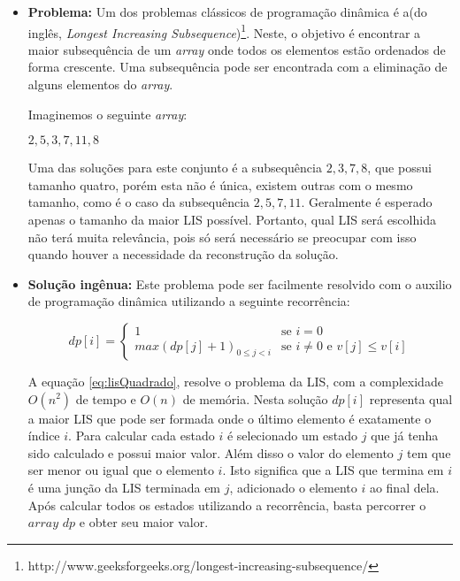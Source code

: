 \begin{itemize}[leftmargin=-.001in]
 \item \textbf{Problema:} Um dos problemas clássicos de programação dinâmica é a(do inglês, \textit{Longest Increasing Subsequence})\footnote{http://www.geeksforgeeks.org/longest-increasing-subsequence/}. Neste, o objetivo é encontrar a maior subsequência de um \textit{array} onde todos os elementos estão ordenados de forma crescente. Uma subsequência pode ser encontrada com a eliminação de alguns elementos do \textit{array}.

Imaginemos o seguinte \textit{array}:

\begin{center}
	${2, 5, 3, 7, 11, 8}$
\end{center}

Uma das soluções para este conjunto é a subsequência ${2, 3, 7, 8}$, que possui tamanho quatro, porém esta não é única, existem outras com o mesmo tamanho, como é o caso da subsequência ${2, 5, 7, 11}$. Geralmente é esperado apenas o tamanho da maior LIS possível. Portanto, qual LIS será escolhida não terá muita relevância, pois só será necessário se preocupar com isso quando houver a necessidade da reconstrução da solução.

\item \textbf{Solução ingênua:} Este problema pode ser facilmente resolvido com o auxilio de programação dinâmica utilizando a seguinte recorrência:

\begin{equation}
dp[i] = 
\begin{cases}
1 &\text{se } i = 0 \\
max(dp[j] + 1)_{0 \leq j < i} &\text{se } i \neq 0 \text{ e } v[j] \leq v[i]

\end{cases}
\label{eq:lisQuadrado}
\end{equation}

A equação \ref{eq:lisQuadrado}, resolve o problema da LIS, com a complexidade $O(n^2)$ de tempo e $O(n)$ de memória. Nesta solução $dp[i]$ representa qual a maior LIS que pode ser formada onde o último elemento é exatamente o índice $i$. Para calcular cada estado $i$ é selecionado um estado $j$ que já tenha sido calculado e possui maior valor. Além disso o valor do elemento $j$ tem que ser menor ou igual que o elemento $i$. Isto significa que a LIS que termina em $i$ é uma junção da LIS terminada em $j$, adicionado o elemento $i$ ao final dela. Após calcular todos os estados utilizando a recorrência, basta percorrer o $array$ $dp$ e obter seu maior valor.


\end{itemize}
